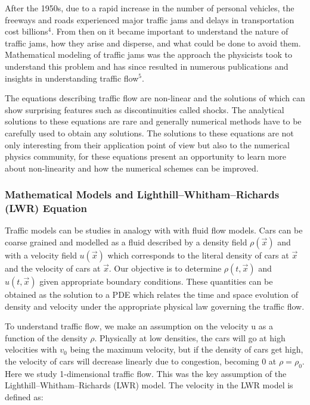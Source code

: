 \documentclass[11pt]{article}
\begin{document}
After the 1950s, due to a rapid increase in the number of personal
vehicles, the freeways and roads experienced major traffic jams and
delays in transportation cost billions\(^4\). From then on it became
important to understand the nature of traffic jams, how they arise and
disperse, and what could be done to avoid them. Mathematical modeling of
traffic jams was the approach the physicists took to understand this
problem and has since resulted in numerous publications and insights in
understanding traffic flow\(^5\).

The equations describing traffic flow are non-linear and the solutions
of which can show surprising features such as discontinuities called
shocks. The analytical solutions to these equations are rare and
generally numerical methods have to be carefully used to obtain any
solutions. The solutions to these equations are not only interesting
from their application point of view but also to the numerical physics
community, for these equations present an opportunity to learn more
about non-linearity and how the numerical schemes can be improved.

\subsubsection{Mathematical Models and Lighthill--Whitham--Richards
(LWR)
Equation}\label{mathematical-models-and-lighthillwhithamrichards-lwr-equation}

Traffic models can be studies in analogy with with fluid flow models.
Cars can be coarse grained and modelled as a fluid described by a
density field \(\rho(\vec{x})\) and with a velocity field \(u(\vec{x})\)
which corresponds to the literal density of cars at \(\vec{x}\) and the
velocity of cars at \(\vec{x}\). Our objective is to determine
\(\rho(t,\vec{x})\) and \(u(t,\vec{x})\) given appropriate boundary
conditions. These quantities can be obtained as the solution to a PDE
which relates the time and space evolution of density and velocity under
the appropriate physical law governing the traffic flow.

To understand traffic flow, we make an assumption on the velocity u as a
function of the density \(\rho\). Physically at low densities, the cars
will go at high velocities with \(v_0\) being the maximum velocity, but
if the density of cars get high, the velocity of cars will decrease
linearly due to congestion, becoming 0 at \(\rho = \rho_0\). Here we
study 1-dimensional traffic flow. This was the key assumption of the
Lighthill--Whitham--Richards (LWR) model. The velocity in the LWR model
is defined as:
\end{document}
